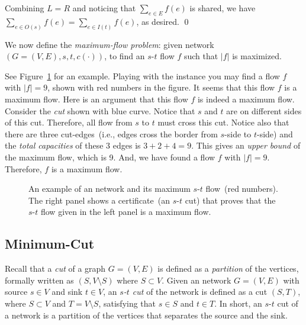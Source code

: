 Combining $L = R$ and noticing that $\sum_{e\in E} f(e)$ is shared, we have $\sum_{e\in O(s)} f(e) = \sum_{e\in I(t)} f(e)$, as desired.  \qed

We now define the \emph{maximum-flow problem}: given network $(G= (V, E), s, t, c(\cdot))$,
to find an $s$-$t$ flow $f$ such that $|f|$ is maximized.

See Figure~\ref{fig:maxflow} for an example. Playing with the instance you may find
a flow $f$ with $|f| = 9$, shown with red numbers in the figure.
It seems that this flow $f$ is a maximum flow.
Here is an argument that this flow $f$ is indeed a maximum flow.
Consider the \emph{cut} shown with blue curve. Notice that
$s$ and $t$ are on different sides of this cut. Therefore, all flow
from $s$ to $t$ must cross this cut. Notice also that there are three
cut-edges~(i.e., edges cross the border from $s$-side to $t$-side)
and the \emph{total capacities} of these 3 edges is $3 + 2 + 4 = 9$.
This gives an \emph{upper bound} of the maximum flow, which is 9.
And, we have found a flow $f$ with $|f| = 9$. Therefore, $f$
is a maximum flow.

\begin{figure}[h]
\centering{}
\caption{An example of an network and its maximum $s$-$t$ flow~(red numbers).
The right panel shows a certificate~(an $s$-$t$ cut) that proves that
the $s$-$t$ flow given in the left panel is a maximum flow.}
\label{fig:maxflow}
\end{figure}


\subsection*{Minimum-Cut}

Recall that a \emph{cut} of a graph $G = (V, E)$ is defined
as a \emph{partition} of the vertices, formally written as $(S, V\setminus S)$ where $S \subset V$.
Given an network $G=(V, E)$ with source $s\in V$ and sink $t\in V$, 
an \emph{$s$-$t$ cut} of the network is defined as a cut $(S, T)$, where $S\subset V$ and $T = V\setminus S$,
satisfying that $s\in S$ and $t\in T$. In short, an $s$-$t$ cut of a network is a partition
of the vertices that separates the source and the sink.


